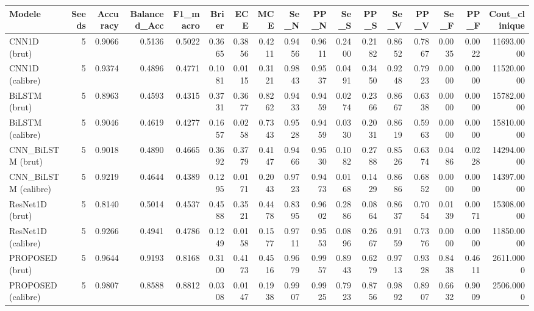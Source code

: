 \begin{tabular}{lrrrrrrrrrrrrrrrr}
\toprule
Modele & Seeds & Accuracy & Balanced_Acc & F1_macro & Brier & ECE & MCE & Se_N & PP_N & Se_S & PP_S & Se_V & PP_V & Se_F & PP_F & Cout_clinique \\
\midrule
CNN1D (brut) & 5 & 0.9066 & 0.5136 & 0.5022 & 0.3665 & 0.3856 & 0.4211 & 0.9456 & 0.9611 & 0.2400 & 0.2182 & 0.8652 & 0.7867 & 0.0035 & 0.0022 & 11693.0000 \\
CNN1D (calibre) & 5 & 0.9374 & 0.4896 & 0.4771 & 0.1081 & 0.0115 & 0.3121 & 0.9843 & 0.9537 & 0.0491 & 0.3450 & 0.9248 & 0.7923 & 0.0000 & 0.0000 & 11520.0000 \\
BiLSTM (brut) & 5 & 0.8963 & 0.4593 & 0.4315 & 0.3731 & 0.3677 & 0.8262 & 0.9433 & 0.9459 & 0.0274 & 0.2366 & 0.8667 & 0.6338 & 0.0000 & 0.0000 & 15782.0000 \\
BiLSTM (calibre) & 5 & 0.9046 & 0.4619 & 0.4277 & 0.1657 & 0.0258 & 0.7343 & 0.9528 & 0.9459 & 0.0330 & 0.2031 & 0.8619 & 0.5963 & 0.0000 & 0.0000 & 15810.0000 \\
CNN_BiLSTM (brut) & 5 & 0.9018 & 0.4890 & 0.4665 & 0.3692 & 0.3779 & 0.4147 & 0.9466 & 0.9530 & 0.1082 & 0.2788 & 0.8526 & 0.6374 & 0.0486 & 0.0228 & 14294.0000 \\
CNN_BiLSTM (calibre) & 5 & 0.9219 & 0.4644 & 0.4389 & 0.1295 & 0.0171 & 0.2043 & 0.9723 & 0.9473 & 0.0168 & 0.1429 & 0.8686 & 0.6852 & 0.0000 & 0.0000 & 14397.0000 \\
ResNet1D (brut) & 5 & 0.8140 & 0.5014 & 0.4537 & 0.4588 & 0.3521 & 0.4478 & 0.8395 & 0.9602 & 0.2886 & 0.0864 & 0.8637 & 0.7054 & 0.0139 & 0.0071 & 15308.0000 \\
ResNet1D (calibre) & 5 & 0.9266 & 0.4941 & 0.4786 & 0.1249 & 0.0158 & 0.1577 & 0.9711 & 0.9553 & 0.0896 & 0.2667 & 0.9159 & 0.7376 & 0.0000 & 0.0000 & 11850.0000 \\
PROPOSED (brut) & 5 & 0.9644 & 0.9193 & 0.8168 & 0.3100 & 0.4173 & 0.4516 & 0.9679 & 0.9957 & 0.8943 & 0.6279 & 0.9713 & 0.9328 & 0.8438 & 0.4611 & 2611.0000 \\
PROPOSED (calibre) & 5 & 0.9807 & 0.8588 & 0.8812 & 0.0308 & 0.0147 & 0.1938 & 0.9907 & 0.9925 & 0.7923 & 0.8756 & 0.9892 & 0.8907 & 0.6632 & 0.9009 & 2506.0000 \\
\bottomrule
\end{tabular}
